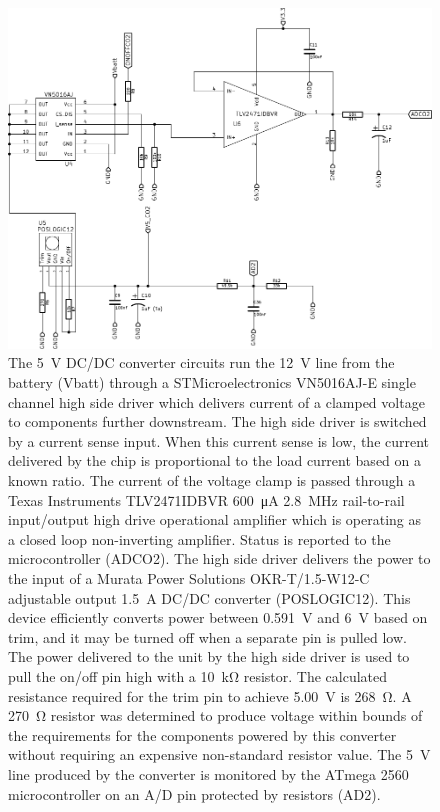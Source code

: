 \documentclass[journal]{IEEEtran}
\begin{document}
\begin{figure}[!t]
	\centering
	\includegraphics[width=\columnwidth,height=0.8\columnwidth,keepaspectratio]{zoom03.pdf}
	\caption[Circuit - 5 V Dc/DC converter circuit]{The \SI{5}{\volt} DC/DC converter circuits run the \SI{12}{\volt} line from the battery (Vbatt) through a STMicroelectronics VN5016AJ-E single channel high side driver which delivers current of a clamped voltage to components further downstream.  The high side driver is switched by a current sense input.  When this current sense is low, the current delivered by the chip is proportional to the load current based on a known ratio.  The current of the voltage clamp is passed through a Texas Instruments TLV2471IDBVR \SI{600}{\micro\ampere} \SI{2.8}{\mega\hertz} rail-to-rail input/output high drive operational amplifier which is operating as a closed loop non-inverting amplifier.  Status is reported to the microcontroller (ADCO2).  The high side driver delivers the power to the input of a Murata Power Solutions OKR-T/1.5-W12-C adjustable output \SI{1.5}{\ampere} DC/DC converter (POSLOGIC12).  This device efficiently converts power between \SI{0.591}{\volt} and \SI{6}{\volt} based on trim, and it may be turned off when a separate pin is pulled low.  The power delivered to the unit by the high side driver is used to pull the on/off pin high with a \SI{10}{\kilo\ohm} resistor.   The calculated resistance required for the trim pin to achieve \SI{5.00}{\volt} is \SI{268}{\ohm}.  A \SI{270}{\ohm} resistor was determined to produce voltage within bounds of the requirements for the components powered by this converter without requiring an expensive non-standard resistor value.  The \SI{5}{\volt} line produced by the converter is monitored by the ATmega 2560 microcontroller on an A/D pin protected by resistors (AD2).}
	\label{fig:zoom03}
\end{figure}
\end{document}
